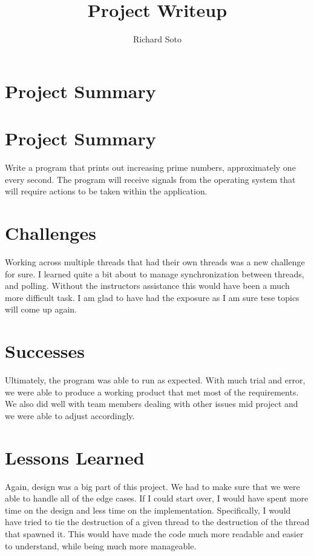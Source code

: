 \documentclass{article}
\title{Project Writeup}
\author{Richard Soto}
\begin{document}
  \maketitle

  \section{Project Summary}

    \section{Project Summary}
    Write a program that prints out increasing prime numbers, approximately one every second. The program will receive
    signals from the operating system that will require actions to be taken within the application.

    \section{Challenges}
    Working across multiple threads that had their own threads was a new challenge for sure. I learned quite a bit about
    to manage synchronization between threads, and polling. Without the instructors assistance this would have been a much more difficult task.
    I am glad to have had the exposure as I am sure tese topics will come up again.

    \section{Successes}
    Ultimately, the program was able to run as expected. With much trial and error, we were able to produce a working
    product that met most of the requirements. We also did well with team members dealing with other issues mid project
    and we were able to adjust accordingly.

    \section{Lessons Learned}
    Again, design was a big part of this project. We had to make sure that we were able to handle all of the edge cases.
    If I could start over, I would have spent more time on the design and less time on the implementation. Specifically,
    I would have tried to tie the destruction of a given thread to the destruction of the thread that spawned it. This would
    have made the code much more readable and easier to understand, while being much more manageable.
  
\end{document}
